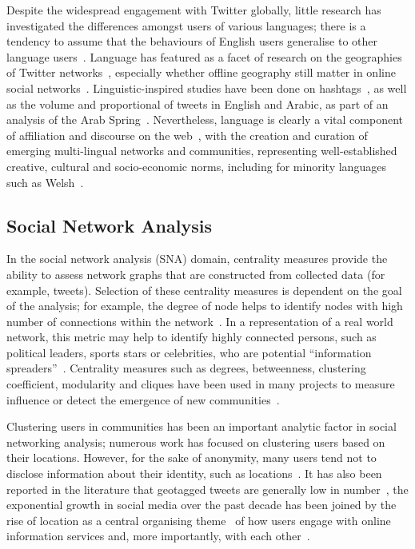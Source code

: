 \documentclass[conference]{IEEEtran}
\begin{document}
Despite the widespread engagement with Twitter globally, little
research has investigated the differences amongst users of various
languages; there is a tendency to assume that the behaviours of
English users generalise to other language
users~\cite{hong-et-al:2011}. Language has featured as a facet of
research on the geographies of Twitter
networks~\cite{takhteyev-et-al:2012}, especially whether offline
geography still matter in online social
networks~\cite{kulshrestha-et-al:2012}. Linguistic-inspired studies
have been done on hashtags~\cite{cunha-et-al:2011}, as well as the
volume and proportional of tweets in English and Arabic, as part of an
analysis of the Arab Spring~\cite{bruns-et-al:2013}. Nevertheless,
language is clearly a vital component of affiliation and discourse on
the web~\cite{zappavigna+martin:2012}, with the creation and curation
of emerging multi-lingual networks and communities, representing
well-established creative, cultural and socio-economic norms,
including for minority languages such as Welsh~\cite{gj+uj:2013}.

\subsection{Social Network Analysis}

In the social network analysis (SNA) domain, centrality measures
provide the ability to assess network graphs that are constructed from
collected data (for example, tweets). Selection of these centrality
measures is dependent on the goal of the analysis; for example, the
degree of node helps to identify nodes with high number of connections
within the
network~\cite{borgatti+everett:2000,rombach-et-al:2014,liu-et-al:2014}.
In a representation of a real world network, this metric may help to
identify highly connected persons, such as political leaders, sports
stars or celebrities, who are potential ``information
spreaders''~\cite{cha-et-al:2012,borge-holthoefer-et-al:2012,zhang-et-al:2016}.
Centrality measures such as degrees, betweenness, clustering
coefficient, modularity and cliques have been used in many projects to
measure influence or detect the emergence of new
communities~\cite{willis-et-al:2015,oatley+crick:2015}.

Clustering users in communities has been an important analytic factor
in social networking analysis; numerous work has focused on clustering
users based on their locations. However, for the sake of anonymity,
many users tend not to disclose information about their identity, such
as locations~\cite{kang-et-al:2013}. It has also been reported in the
literature that geotagged tweets are generally low in
number~\cite{morstatter-et-al:2013,tan-et-al:2013,kumar-et-al:2014},
the exponential growth in social media over the past decade has been
joined by the rise of location as a central organising
theme~\cite{liang-et-al:2013} of how users engage with online
information services and, more importantly, with each
other~\cite{cheng-et-al:2010,caverlee-et-al:2013}.
\end{document}
